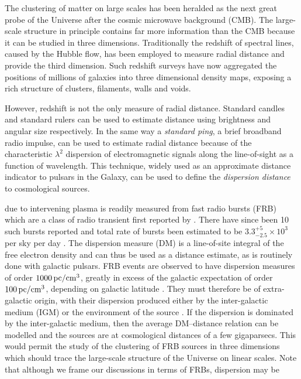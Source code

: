 \documentclass[twocolumn,prl,nofootinbib,floatfix]{revtex4-1}
\begin{document}
The clustering of matter on large scales has been
heralded as the next great probe of the Universe after the cosmic microwave
background (CMB). The large-scale structure in principle contains far more
information than the CMB because it can be studied in three dimensions.
Traditionally the redshift of spectral lines, caused by the Hubble flow, has
been employed to measure radial distance and provide the third dimension.
Such redshift
surveys have now aggregated the positions of millions of galaxies into three
dimensional density maps, exposing a rich structure of clusters, filaments,
walls and voids.

However, redshift is not the only measure of radial distance.   
Standard candles and standard rulers can be used to estimate distance using brightness and angular size respectively.
In the same way a \emph{standard ping}, a brief broadband radio impulse, can be used to estimate radial distance because of
the characteristic $\lambda^2$ dispersion of electromagnetic signals along the line-of-sight as a function of wavelength.
This technique, widely used as an approximate distance indicator to pulsars in the Galaxy, can be used to define the
\emph{dispersion distance} to cosmological sources.


due to intervening plasma
is readily measured from fast radio bursts (FRB) which are a class
of radio transient first reported by \citet{2007Sci...318..777L}.
There have since been 
10 such bursts reported
\citep{2012MNRAS.425L..71K,2013Sci...341...53T,
2014ApJ...790..101S, 2014ApJ...792...19B, 
2015MNRAS.447..246P,2015ApJ...799L...5R} and total rate of bursts
been estimated to be $3.3^{+5}_{-2.5} \times 10^3$
per sky per day \cite{2015arXiv150500834R}. 
The dispersion measure
(DM) is a line-of-site integral of the free electron density and can thus be
used as a distance estimate, as is routinely done with galactic pulsars.
FRB events are observed to have dispersion measures of order
$1000\,{\rm pc} / {\rm cm}^3$, greatly in excess of
the galactic expectation of order $100\,{\rm pc} / {\rm cm}^3$, depending on
galactic latitude
\cite{2014arXiv1412.4829D}.
They must therefore be of extra-galactic origin, with their
dispersion produced either by the
inter-galactic medium (IGM) \citep{2013Sci...341...53T} or the
environment of the source
\citep{2014ApJ...785L..26L,2015arXiv150101341P,2015arXiv150505535C}.
If the dispersion is dominated by the inter-galactic medium,
then the average DM--distance relation can be modelled
\citep{2014ApJ...797...71Z,2004MNRAS.348..999I, 2003ApJ...598L..79I}
and the sources are at
cosmological distances of a few gigaparsecs. This would permit
the study of the clustering of FRB sources in three dimensions which should trace the
large-scale structure of the Universe on linear scales. Note that although we
frame our discussions in terms of FRBs, dispersion may be 
\end{document}
